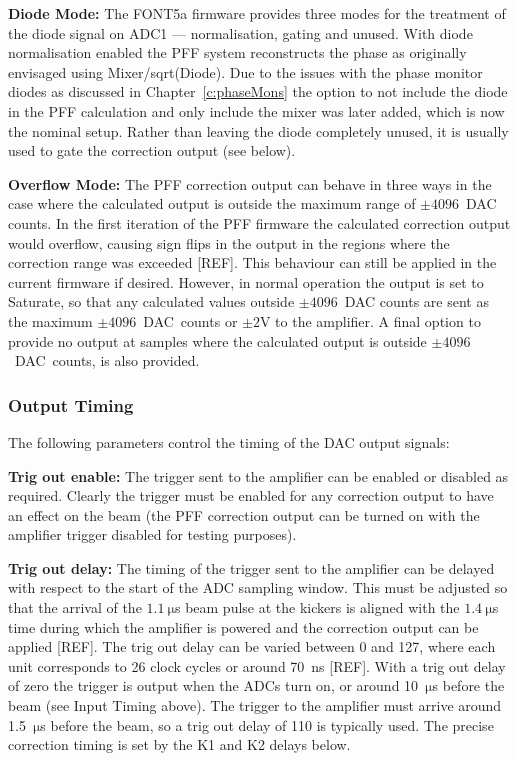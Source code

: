 \textbf{Diode Mode:} The FONT5a firmware provides three modes for the treatment of the diode signal on ADC1 --- normalisation, gating and unused. With diode normalisation enabled the PFF system reconstructs the phase as originally envisaged using Mixer/sqrt(Diode). Due to the issues with the phase monitor diodes as discussed in Chapter~\ref{c:phaseMons} the option to not include the diode in the PFF calculation and only include the mixer was later added, which is now the nominal setup. Rather than leaving the diode completely unused, it is usually used to gate the correction output (see below).

\textbf{Overflow Mode:} The PFF correction output can behave in three ways in the case where the calculated output is outside the maximum range of \(\pm4096\)~DAC counts. In the first iteration of the PFF firmware the calculated correction output would overflow, causing sign flips in the output in the regions where the correction range was exceeded [REF]. This behaviour can still be applied in the current firmware if desired. However, in normal operation the output is set to Saturate, so that any calculated values outside \(\pm4096\)~DAC counts are sent as the maximum \(\pm4096\)~DAC~counts or \(\pm2\)V to the amplifier. A final option to provide no output at samples where the calculated output is outside \(\pm4096\)~DAC~counts, is also provided.

\subsubsection{Output Timing}

The following parameters control the timing of the DAC output signals:

\textbf{Trig out enable:} The trigger sent to the amplifier can be enabled or disabled as required. Clearly the trigger must be enabled for any correction output to have an effect on the beam (the PFF correction output can be turned on with the amplifier trigger disabled for testing purposes).

\textbf{Trig out delay:} The timing of the trigger sent to the amplifier can be delayed with respect to the start of the ADC sampling window. This must be adjusted so that the arrival of the \(1.1~\mathrm{\mu}\)s beam pulse at the kickers is aligned with the \(1.4~\mathrm{\mu}\)s time during which the amplifier is powered and the correction output can be applied [REF]. The trig out delay can be varied between 0 and 127, where each unit corresponds to 26 clock cycles or around 70~ns [REF]. With a trig out delay of zero the trigger is output when the ADCs turn on, or around 10~\(\mathrm{\mu}\)s before the beam (see Input Timing above). The trigger to the amplifier must arrive around 1.5~\(\mathrm{\mu}\)s before the beam, so a trig out delay of 110 is typically used. The precise correction timing is set by the K1 and K2 delays below.

